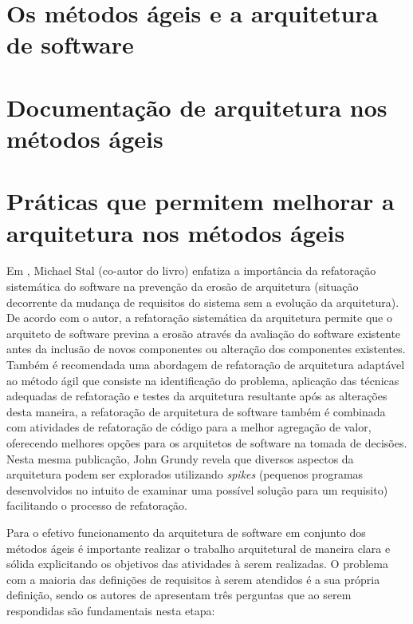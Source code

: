 \section{Os métodos ágeis e a arquitetura de software}



\section{Documentação de arquitetura nos métodos ágeis}

\section{Práticas que permitem melhorar a arquitetura nos métodos ágeis}

Em \cite{babar2013agile}, Michael Stal (co-autor do livro) enfatiza a importância da refatoração sistemática do software na prevenção da erosão de arquitetura (situação decorrente da mudança de requisitos do sistema sem a evolução da arquitetura). De acordo com o autor, a refatoração sistemática da arquitetura  permite que o arquiteto de software previna a erosão através da avaliação do software existente antes da inclusão de novos componentes ou alteração dos componentes existentes. Também é recomendada uma abordagem de refatoração de arquitetura adaptável ao método ágil que consiste na identificação do problema, aplicação das técnicas adequadas de refatoração e testes da arquitetura resultante após as alterações desta maneira, a refatoração de arquitetura de software também é combinada com atividades de refatoração de código para a melhor agregação de valor, oferecendo melhores opções para os arquitetos de software na tomada de decisões. Nesta mesma publicação, John Grundy revela que diversos aspectos da arquitetura podem ser explorados utilizando \textit{spikes} (pequenos programas desenvolvidos no intuito de examinar uma possível solução para um requisito) facilitando o processo de refatoração.

Para o efetivo funcionamento da arquitetura de software em conjunto dos métodos ágeis é importante realizar o trabalho arquitetural de maneira clara e sólida explicitando os objetivos das atividades à serem realizadas. O problema com a maioria das definições de requisitos à serem atendidos é a sua própria definição, sendo os autores de \cite{babar2013agile} apresentam três perguntas que ao serem respondidas são fundamentais nesta etapa:

